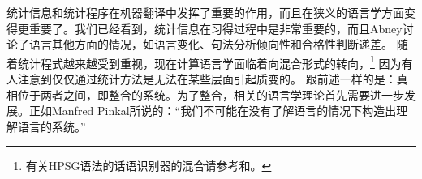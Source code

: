 统计信息和统计程序在机器翻译中发挥了重要的作用，而且在狭义的语言学方面变得更重要了\citep{Abney96a}。我们已经看到，统计信息在习得过程中是非常重要的，而且Abney讨论了语言其他方面的情况，如语言变化、句法分析倾向性和合格性判断递差。
随着统计程式越来越受到重视，现在计算语言学面临着向混合形式的转向，\footnote{
有关HPSG语法的话语识别器的混合请参考和。
}
因为有人注意到仅仅通过统计方法是无法在某些层面引起质变的\citep{Steedman2011a,Church2011a,Kay2011a}。
跟前述一样的是：真相位于两者之间，即整合的系统。为了整合，相关的语言学理论首先需要进一步发展。正如Manfred Pinkal所说的：“我们不可能在没有了解语言的情况下构造出理解语言的系统。”


